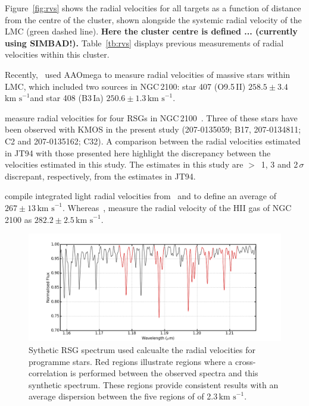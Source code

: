 \documentclass[useAMS,usenatbib]{mn2e}
\def\kms{$\mbox{km s}^{-1}$}
\begin{document}
Figure~\ref{fig:rvs} shows the radial velocities for all targets as a function of distance from the centre of the cluster, shown alongside the systemic radial velocity of the LMC (green dashed line).
\textbf{Here the cluster centre is defined ... (currently using SIMBAD!).}
Table~\ref{tb:rvs} displays previous measurements of radial velocities within this cluster.

Recently,~\cite{2015arXiv150803490E} used AAOmega to measure radial velocities of massive stars within LMC, which included two sources in NGC\,2100: star 407 (O9.5\,II) $258.5\pm3.4$\,\kms and star 408 (B3\,Ia) $250.6\pm1.3$\,\kms.

\cite{1994A&A...282..717J} measure radial velocities for four RSGs in NGC\,2100~\citep[B17, C2, C32 and C34 using the nomenclature of][]{1974A&AS...15..261R}.
Three of these stars have been observed with KMOS in the present study (207-0135059; B17, 207-0134811; C2 and 207-0135162; C32).
A comparison between the radial velocities estimated in JT94 with those presented here highlight the discrepancy between the velocities estimated in this study.
The estimates in this study are $>$~1, 3 and 2\,$\sigma$ discrepant, respectively, from the estimates in JT94.



\cite{1983ApJ...272..488F} compile integrated light radial velocities from~\cite{1972MNRAS.159..445A} and \cite{1970PhD...........F} to define an average of $267\pm13\,$\kms.
Whereas~\cite{1971ApJ...169..271S}, measure the radial velocity of the HII gas of NGC\,2100 as $282.2\pm2.5\,$\kms.


\begin{figure}
 \includegraphics[width=18.0cm]{NGC2100-rv-regions}
 \caption{Sythetic RSG spectrum used calcualte the radial velocities for programme stars.
 Red regions illustrate regions where a cross-correlation is performed between the observed spectra and this synthetic spectrum.
 These regions provide consistent results with an average dispersion between the five regions of of 2.3\,\kms.
\label{fig:rv-regions}
          }
\end{figure}
\end{document}
